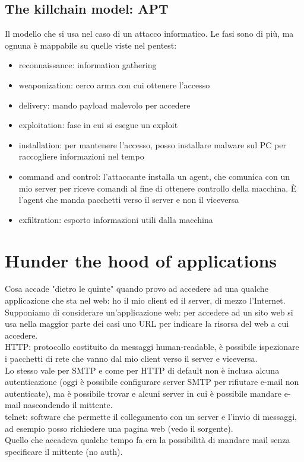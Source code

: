 \documentclass{article}
\begin{document}
\subsection{The killchain model: APT}
Il modello che si usa nel caso di un attacco informatico. Le fasi sono di più, ma ognuna è mappabile su quelle viste nel pentest:
\begin{itemize}
\item reconnaissance: information gathering
\item weaponization: cerco arma con cui ottenere l'accesso
\item delivery: mando payload malevolo per accedere
\item exploitation: fase in cui si esegue un exploit
\item installation: per mantenere l'accesso, posso installare malware sul PC per raccogliere informazioni nel tempo
\item command and control: l'attaccante installa un agent, che comunica con un mio server per riceve comandi al fine di ottenere controllo della macchina. È l'agent che manda pacchetti verso il server e non il viceversa
\item exfiltration: esporto informazioni utili dalla macchina
\end{itemize}
\section{Hunder the hood of applications}
Cosa accade "dietro le quinte" quando provo ad accedere ad una qualche applicazione che sta nel web: ho il mio client ed il server, di mezzo l'Internet.\\ Supponiamo di considerare un'applicazione web: per accedere ad un sito web si usa nella maggior parte dei casi uno URL per indicare la risorsa del web a cui accedere.\\ HTTP: protocollo costituito da messaggi human-readable, è possibile ispezionare i pacchetti di rete che vanno dal mio client verso il server e viceversa.\\ Lo stesso vale per SMTP e come per HTTP di default non è inclusa alcuna autenticazione (oggi è possibile configurare server SMTP per rifiutare e-mail non autenticate), ma è possibile trovar e alcuni server in cui è possibile mandare e-mail nascondendo il mittente.\\ telnet: software che permette il collegamento con un server e l'invio di messaggi, ad esempio posso richiedere una pagina web (vedo il sorgente).\\ Quello che accadeva qualche tempo fa era la possibilità di mandare mail senza specificare il mittente (no auth).
\end{document}
